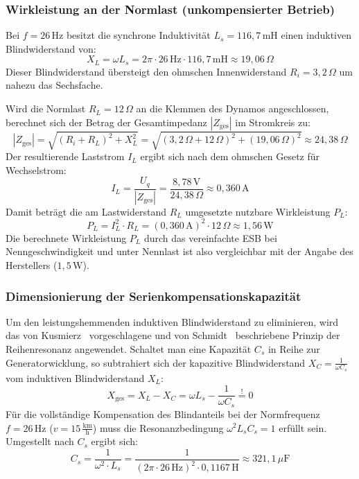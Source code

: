 \documentclass[12pt,a4paper]{article}
\begin{document}
\subsubsection{Wirkleistung an der Normlast (unkompensierter Betrieb)}
Bei $f = 26\,\text{Hz}$ besitzt die synchrone Induktivität $L_s = 116{,}7\,\text{mH}$ einen induktiven Blindwiderstand von:
\begin{equation*}
    X_L = \omega L_s = 2\pi \cdot 26\,\text{Hz} \cdot 116{,}7\,\text{mH} \approx 19{,}06\,\Omega
\end{equation*}
Dieser Blindwiderstand übersteigt den ohmschen Innenwiderstand $R_i = 3{,}2\,\Omega$ um nahezu das Sechsfache. 

Wird die Normlast $R_L = 12\,\Omega$ an die Klemmen des Dynamos angeschlossen, berechnet sich der Betrag der Gesamtimpedanz 
$|Z_{\text{ges}}|$ im Stromkreis zu:
\begin{equation*}
    |Z_{\text{ges}}| = \sqrt{(R_i + R_L)^2 + X_L^2} = \sqrt{(3{,}2\,\Omega + 12\,\Omega)^2 + (19{,}06\,\Omega)^2} \approx 24{,}38\,\Omega
\end{equation*}
Der resultierende Laststrom $I_L$ ergibt sich nach dem ohmschen Gesetz für Wechselstrom:
\begin{equation*}
    I_L = \frac{U_q}{|Z_{\text{ges}}|} = \frac{8{,}78\,\text{V}}{24{,}38\,\Omega} \approx 0{,}360\,\text{A}
\end{equation*}
Damit beträgt die am Lastwiderstand $R_L$ umgesetzte nutzbare Wirkleistung $P_L$:
\begin{equation*}
    P_L = I_L^2 \cdot R_L = (0{,}360\,\text{A})^2 \cdot 12\,\Omega \approx 1{,}56\,\text{W}
\end{equation*}
Die berechnete Wirkleistung $P_L$ durch das vereinfachte ESB bei Nenngeschwindigkeit und unter Nennlast ist also vergleichbar 
mit der Angabe des Herstellers ($1{,}5\,\text{W}$). 

\subsubsection{Dimensionierung der Serienkompensationskapazität}
Um den leistungshemmenden induktiven Blindwiderstand zu eliminieren, wird das von Kusmierz~\cite{kusmierz1985} vorgeschlagene 
und von Schmidt~\cite{schmidt2006} beschriebene Prinzip der Reihenresonanz angewendet. Schaltet man eine Kapazität $C_s$ in 
Reihe zur Generatorwicklung, so subtrahiert sich der kapazitive Blindwiderstand $X_C = \frac{1}{\omega C_s}$ vom induktiven Blindwiderstand $X_L$:
\begin{equation*}
    X_{\text{ges}} = X_L - X_C = \omega L_s - \frac{1}{\omega C_s} \stackrel{!}{=} 0
\end{equation*}
Für die vollständige Kompensation des Blindanteils bei der Normfrequenz $f = 26\,\text{Hz}$ ($v = 15\,\frac{\text{km}}{\text{h}}$) muss die Resonanzbedingung $\omega^2 L_s C_s = 1$ erfüllt sein. Umgestellt nach $C_s$ ergibt sich:
\begin{equation*}
    C_s = \frac{1}{\omega^2 \cdot L_s} = \frac{1}{(2\pi \cdot 26\,\text{Hz})^2 \cdot 0{,}1167\,\text{H}} \approx 321{,}1\,\mu\text{F}
\end{equation*}
\end{document}
